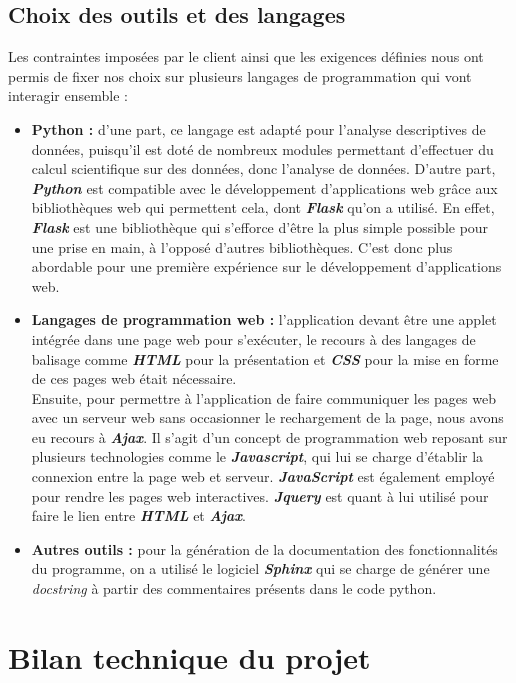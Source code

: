 		\subsection{Choix des outils et des langages}
		Les contraintes imposées par le client ainsi que les exigences définies nous ont permis de fixer nos choix sur plusieurs langages de programmation qui vont interagir ensemble : 
		\begin{itemize}[leftmargin=*]
			\item \textbf{Python :} d'une part, ce langage est adapté pour l'analyse descriptives de données, puisqu'il est doté de nombreux modules permettant d'effectuer du calcul scientifique sur des données, donc l'analyse de données. D'autre part, \textbf{\textit{Python}} est compatible avec le développement d’applications web grâce aux bibliothèques web qui permettent cela, dont \textbf{\textit{Flask}} qu'on a utilisé. En effet, \textbf{\textit{Flask}} est une bibliothèque qui s’efforce d’être la plus simple possible pour une prise en main, à l'opposé d'autres bibliothèques. C'est donc plus abordable pour une première expérience sur le développement d'applications web.
			\item \textbf{Langages de programmation web :} l'application devant être une applet intégrée dans une page web pour s'exécuter, le recours à des langages de balisage comme \textbf{\textit{HTML}} pour la présentation et \textbf{\textit{CSS}} pour la mise en forme de ces pages web était nécessaire.\\
			Ensuite, pour permettre à l'application de faire communiquer les pages web avec un serveur web sans occasionner le rechargement de la page, nous avons eu recours à \textbf{\textit{Ajax}}. Il s'agit d'un concept de programmation web reposant sur plusieurs technologies comme le \textbf{\textit{Javascript}}, qui lui se charge d'établir la connexion entre la page web et serveur. \textbf{\textit{JavaScript}} est également employé pour rendre les pages web interactives. \textbf{\textit{Jquery}} est quant à lui utilisé pour faire le lien entre \textbf{\textit{HTML}} et \textbf{\textit{Ajax}}.
			\item \textbf{Autres outils :} pour la génération de la documentation des fonctionnalités du programme, on a utilisé le logiciel \textbf{\textit{Sphinx}} qui se charge de générer une \textit{docstring} à partir des commentaires présents dans le code python.
		\end{itemize}
		
	\section{Bilan technique du projet}
